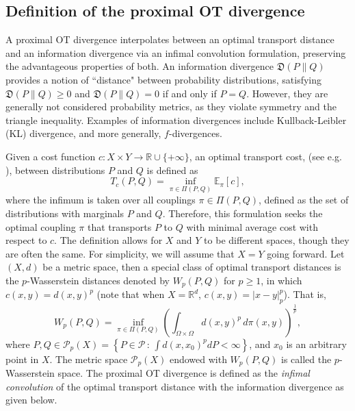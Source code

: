 \documentclass{amsart}
\newcommand{\BZ}[1]{\textcolor{olive}{BZ: #1}}
\theoremstyle{definition}
\theoremstyle{remark}
\numberwithin{equation}{section}
\begin{document}
\subsection{Definition of the proximal OT divergence} \label{sec:definition}
A proximal OT divergence interpolates between an optimal transport distance and an information divergence via an infimal convolution formulation, preserving the advantageous properties of both. An information divergence $\mathfrak{D}(P\|Q)$ provides a notion of ``distance" between probability distributions, satisfying $\mathfrak{D}(P\|Q)\ge 0$ and $\mathfrak{D}(P\|Q)=0$ if and only if $P=Q$.  However, they are generally not considered probability metrics, as they violate symmetry and the triangle inequality. Examples of information divergences include Kullback-Leibler (KL) divergence, and more generally, $f$-divergences.

 
Given a cost function $c: X \times Y \to \mathbb{R}\cup \{+\infty\}$, an optimal transport cost, (see e.g. \cite{Villani2003topics,Villani2009oldandnew,Santambrogio}), between distributions $P$ and $Q$ is defined as
\begin{equation}\label{eq:transport:cost}
T_{c}(P,Q) =  \inf_{\pi \in \Pi(P,Q)} \mathbb{E}_{\pi}[c],
\end{equation}
where the infimum is taken over all couplings $\pi \in \Pi(P,Q)$, defined as the set of distributions with marginals $P$ and $Q$. Therefore, this formulation seeks the optimal coupling $\pi$ that transports $P$ to $Q$ with minimal average cost with respect to $c$. The definition allows for $X$ and $Y$ to be different spaces, though they are often the same. For simplicity, we will assume that $X=Y$ going forward.  
Let $(X,d)$ be a metric space, then a special class of optimal transport distances is the $p$-Wasserstein distances denoted by $W_p(P,Q)$ for $p\geq 1$, in which $c(x,y) = d(x,y)^p$ (note that when $X=\mathbb{R}^d$, $c(x,y)=|x-y|_p^p$). That is, 
\begin{equation}\label{def:wass.p}
W_p(P, Q) = \inf_{\pi \in \Pi(P, Q)} \left( \int_{\Omega \times \Omega} d(x,y)^p \, d\pi(x, y) \right)^{\frac{1}{p}},
\end{equation}
where $P,Q\in \mathcal{P}_p(X) = \left\{ P \in \mathcal{P} \,:\,  \int d(x,x_0) ^p dP < \infty\right\}$, and $x_0$ is an arbitrary point in $X$. The metric space $\mathcal{P}_p(X)$ endowed with $W_p(P, Q)$ is called the $p$-Wasserstein space. The proximal OT divergence is defined as the \emph{infimal convolution} of the optimal transport distance with the information divergence as given below.
\end{document}
